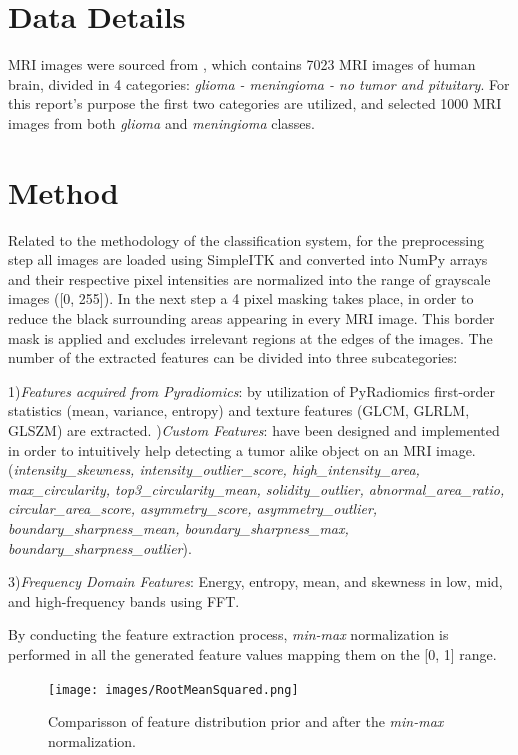 \documentclass[11pt,a4paper]{report}
\begin{document}
    \section{Data Details}
	MRI images were sourced from \cite{data}, which contains 7023 MRI images of human brain, divided 
	in 4 categories: \textit{glioma - meningioma - no tumor and pituitary}.
	For this report's purpose the first two categories are utilized, and selected 1000 MRI images from both \textit{glioma} and
	\textit{meningioma} classes.

    \section{Method}
	
	\par Related to the methodology of the classification system, for the preprocessing step
	all images are loaded using SimpleITK
	and converted into NumPy arrays and their respective pixel intensities are 
	normalized into the range of grayscale images ([0, 255]).
	In the next step a 4 pixel masking takes place, in order to reduce the black surrounding areas
	appearing in every MRI image. This border mask is applied and excludes irrelevant regions at the 
	edges of the images. The number of the extracted features can be divided into three subcategories:

	1)\textit{Features acquired from Pyradiomics}: by utilization of PyRadiomics first-order statistics (mean, variance, entropy) and
	texture features (GLCM, GLRLM, GLSZM) are extracted.
	)\textit{Custom Features}: have been designed and implemented in order to intuitively help detecting a tumor alike
	object on an MRI image. (\textit{intensity\_skewness, intensity\_outlier\_score, high\_intensity\_area, max\_circularity,
	top3\_circularity\_mean, solidity\_outlier, abnormal\_area\_ratio, circular\_area\_score, asymmetry\_score, asymmetry\_outlier,
	boundary\_sharpness\_mean, boundary\_sharpness\_max, boundary\_sharpness\_outlier}).

	3)\textit{Frequency Domain Features}: Energy, entropy, mean, and skewness in low, mid, and high-frequency 
	bands using FFT.
	

	By conducting the feature extraction process, \textit{min-max} normalization is performed in all the generated feature values
	mapping them on the [0, 1] range. 
		\begin{figure}[h]
			\centering
			\texttt{[image: images/RootMeanSquared.png]}
			\caption{Comparisson of feature distribution prior and after the \textit{min-max} normalization.}
			\label{fig1:}
		\end{figure}		
\end{document}
